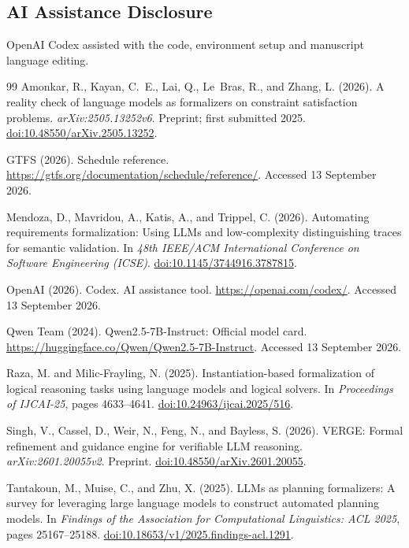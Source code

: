 \documentclass[a4paper,twoside]{article}
\begin{document}
\subsection*{AI Assistance Disclosure}
\label{sec:ai}
OpenAI Codex \cite{codex} assisted with the code, environment setup and manuscript language editing.


\begin{thebibliography}{99}
Amonkar, R., Kayan, C.~E., Lai, Q., Le~Bras, R., and Zhang, L. (2026).
A reality check of language models as formalizers on constraint satisfaction problems.
\emph{arXiv:2505.13252v6}. Preprint; first submitted 2025.
\href{https://arxiv.org/abs/2505.13252v6}{doi:10.48550/arXiv.2505.13252}.

GTFS (2026). Schedule reference.
\url{https://gtfs.org/documentation/schedule/reference/}. Accessed 13 September 2026.

Mendoza, D., Mavridou, A., Katis, A., and Trippel, C. (2026).
Automating requirements formalization: Using LLMs and low-complexity distinguishing traces for semantic validation.
In \emph{48th IEEE/ACM International Conference on Software Engineering (ICSE)}.
\href{https://doi.org/10.1145/3744916.3787815}{doi:10.1145/3744916.3787815}.

OpenAI (2026). Codex. AI assistance tool.
\url{https://openai.com/codex/}. Accessed 13 September 2026.

Qwen Team (2024). Qwen2.5-7B-Instruct: Official model card.
\url{https://huggingface.co/Qwen/Qwen2.5-7B-Instruct}. Accessed 13 September 2026.

Raza, M. and Milic-Frayling, N. (2025).
Instantiation-based formalization of logical reasoning tasks using language models and logical solvers.
In \emph{Proceedings of IJCAI-25}, pages 4633--4641.
\href{https://doi.org/10.24963/ijcai.2025/516}{doi:10.24963/ijcai.2025/516}.

Singh, V., Cassel, D., Weir, N., Feng, N., and Bayless, S. (2026).
VERGE: Formal refinement and guidance engine for verifiable LLM reasoning.
\emph{arXiv:2601.20055v2}. Preprint.
\href{https://arxiv.org/abs/2601.20055v2}{doi:10.48550/arXiv.2601.20055}.

Tantakoun, M., Muise, C., and Zhu, X. (2025).
LLMs as planning formalizers: A survey for leveraging large language models to construct automated planning models.
In \emph{Findings of the Association for Computational Linguistics: ACL 2025}, pages 25167--25188.
\href{https://doi.org/10.18653/v1/2025.findings-acl.1291}{doi:10.18653/v1/2025.findings-acl.1291}.


\end{thebibliography}
\end{document}

